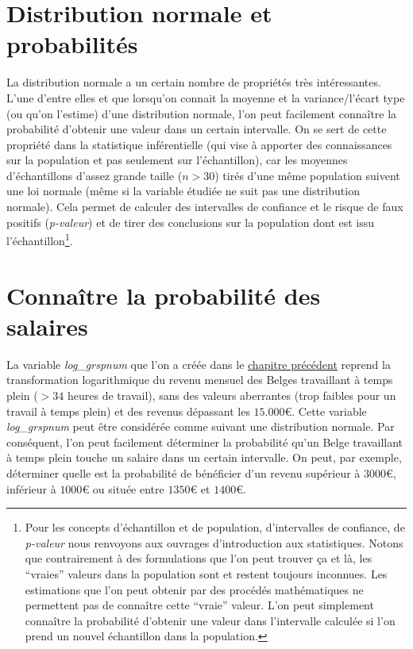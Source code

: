 \documentclass[
]{book}
\begin{document}
\hypertarget{distribution_normale_proba}{%
\section{Distribution normale et probabilités}\label{distribution_normale_proba}}

La distribution normale a un certain nombre de propriétés très intéressantes. L'une d'entre elles et que lorsqu'on connait la moyenne et la variance/l'écart type (ou qu'on l'estime) d'une distribution normale, l'on peut facilement connaître la probabilité d'obtenir une valeur dans un certain intervalle. On se sert de cette propriété dans la statistique inférentielle (qui vise à apporter des connaissances sur la population et pas seulement sur l'échantillon), car les moyennes d'échantillons d'assez grande taille (\(n>30\)) tirés d'une même population suivent une loi normale (même si la variable étudiée ne suit pas une distribution normale). Cela permet de calculer des intervalles de confiance et le risque de faux positifs (\emph{p-valeur}) et de tirer des conclusions sur la population dont est issu l'échantillon\footnote{Pour les concepts d'échantillon et de population, d'intervalles de confiance, de \emph{p-valeur} nous renvoyons aux ouvrages d'introduction aux statistiques. Notons que contrairement à des formulations que l'on peut trouver ça et là, les ``vraies'' valeurs dans la population sont et restent toujours inconnues. Les estimations que l'on peut obtenir par des procédés mathématiques ne permettent pas de connaître cette ``vraie'' valeur. L'on peut simplement connaître la probabilité d'obtenir une valeur dans l'intervalle calculée si l'on prend un nouvel échantillon dans la population.}.

\hypertarget{connauxeetre-la-probabilituxe9-des-salaires}{%
\section{Connaître la probabilité des salaires}\label{connauxeetre-la-probabilituxe9-des-salaires}}

La variable \emph{log\_grspnum} que l'on a créée dans le \protect\hyperlink{trans_log_grspnum}{chapitre précédent} reprend la transformation logarithmique du revenu mensuel des Belges travaillant à temps plein (\(>34\) heures de travail), sans des valeurs aberrantes (trop faibles pour un travail à temps plein) et des revenus dépassant les \(15.000€\). Cette variable \emph{log\_grspnum} peut être considérée comme suivant une distribution normale. Par conséquent, l'on peut facilement déterminer la probabilité qu'un Belge travaillant à temps plein touche un salaire dans un certain intervalle. On peut, par exemple, déterminer quelle est la probabilité de bénéficier d'un revenu supérieur à \(3000€\), inférieur à \(1000€\) ou située entre \(1350€\) et \(1400€\).
\end{document}
